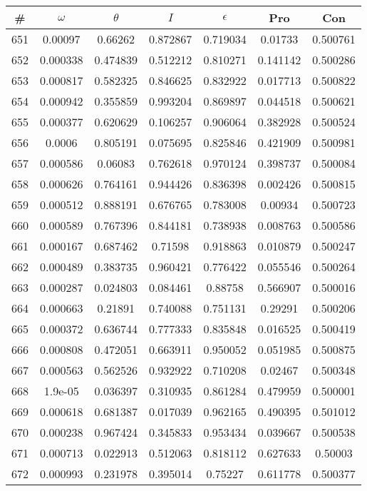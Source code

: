 \newpage
\begin{table}
\begin{tabular}{c|c|c|c|c|c|c}
\# & $\omega$ & $\theta$ & $I$ & $\epsilon$ & Pro & Con\\
\hline
651 & 0.00097 & 0.66262 & 0.872867 & 0.719034 & 0.01733 & 0.500761\\
652 & 0.000338 & 0.474839 & 0.512212 & 0.810271 & 0.141142 & 0.500286\\
653 & 0.000817 & 0.582325 & 0.846625 & 0.832922 & 0.017713 & 0.500822\\
654 & 0.000942 & 0.355859 & 0.993204 & 0.869897 & 0.044518 & 0.500621\\
655 & 0.000377 & 0.620629 & 0.106257 & 0.906064 & 0.382928 & 0.500524\\
656 & 0.0006 & 0.805191 & 0.075695 & 0.825846 & 0.421909 & 0.500981\\
657 & 0.000586 & 0.06083 & 0.762618 & 0.970124 & 0.398737 & 0.500084\\
658 & 0.000626 & 0.764161 & 0.944426 & 0.836398 & 0.002426 & 0.500815\\
659 & 0.000512 & 0.888191 & 0.676765 & 0.783008 & 0.00934 & 0.500723\\
660 & 0.000589 & 0.767396 & 0.844181 & 0.738938 & 0.008763 & 0.500586\\
661 & 0.000167 & 0.687462 & 0.71598 & 0.918863 & 0.010879 & 0.500247\\
662 & 0.000489 & 0.383735 & 0.960421 & 0.776422 & 0.055546 & 0.500264\\
663 & 0.000287 & 0.024803 & 0.084461 & 0.88758 & 0.566907 & 0.500016\\
664 & 0.000663 & 0.21891 & 0.740088 & 0.751131 & 0.29291 & 0.500206\\
665 & 0.000372 & 0.636744 & 0.777333 & 0.835848 & 0.016525 & 0.500419\\
666 & 0.000808 & 0.472051 & 0.663911 & 0.950052 & 0.051985 & 0.500875\\
667 & 0.000563 & 0.562526 & 0.932922 & 0.710208 & 0.02467 & 0.500348\\
668 & 1.9e-05 & 0.036397 & 0.310935 & 0.861284 & 0.479959 & 0.500001\\
669 & 0.000618 & 0.681387 & 0.017039 & 0.962165 & 0.490395 & 0.501012\\
670 & 0.000238 & 0.967424 & 0.345833 & 0.953434 & 0.039667 & 0.500538\\
671 & 0.000713 & 0.022913 & 0.512063 & 0.818112 & 0.627633 & 0.50003\\
672 & 0.000993 & 0.231978 & 0.395014 & 0.75227 & 0.611778 & 0.500377\\

\end{tabular}
\end{table}
